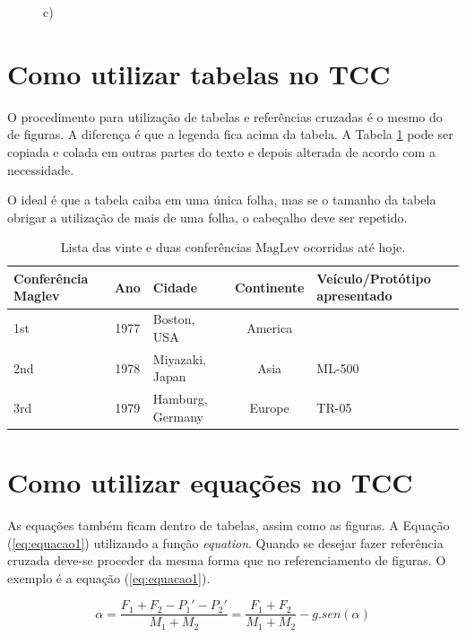 \documentclass[
        oneside,      %
        english,			
        brazil			 
        ]{configcefetmglpd}
\begin{document}
\begin{figure}[h]
\begin{minipage}[t]{3cm}
	\par \centering c)
	\label{fig:SML}
\end{minipage}%
	\label{fig:1figs}%
\end{figure}

\section{Como utilizar tabelas no TCC}
O procedimento para utilização de tabelas e referências cruzadas é o mesmo do de figuras. A diferença é que a legenda fica acima da tabela. A Tabela \ref{tab:lista_Mag} pode ser copiada e colada em outras partes do texto e depois alterada de acordo com a necessidade.

O ideal é que a tabela caiba em uma única folha, mas se o tamanho da tabela obrigar a utilização de mais de uma folha, o cabeçalho deve ser repetido.

\begin{table}[!h]
	\normalsize
	\caption{Lista das vinte e duas conferências MagLev ocorridas até hoje.}
	\label{tab:lista_Mag}
	\begin{center}
		\begin{tabular}{ l | c | l | c | l}
			\hline
			Conferência Maglev & Ano & Cidade & Continente & Veículo/Protótipo apresentado\\ \hline
			1st & 1977 & Boston, USA & America &  \\
			2nd & 1978 & Miyazaki, Japan & Asia & ML-500 \\
			3rd & 1979 & Hamburg, Germany & Europe & TR-05 \\
		\end{tabular}
	\end{center}
\end{table}

\section{Como utilizar equações no TCC}

As equações também ficam dentro de tabelas, assim como as figuras. A Equação (\ref{eq:equacao1}) utilizando a função \textit{equation}.  Quando se desejar fazer referência cruzada deve-se proceder da mesma forma que no referenciamento de figuras. O exemplo é a equação (\ref{eq:equacao1}).

\begin{equation}
	\label{eq:equacao1}
	\alpha = \frac{F_1 + F_2 - P_1' - P_2'}{M_1+M_2} = \frac{F_1 + F_2}{M_1 + M_2}-g.sen(\alpha)
\end{equation}
\end{document}
